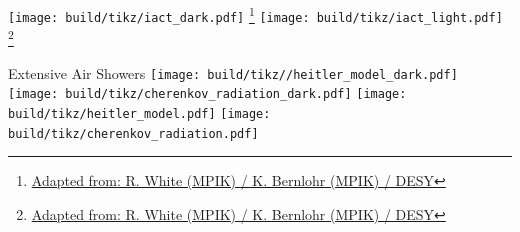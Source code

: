\begin{frame}
  {%
  \centering
  \texttt{[image: build/tikz/iact\_dark.pdf]}
  \footnote{\href{https://www.flickr.com/photos/cta_observatory/45643242354/in/photostream/}{\textcolor{white!85!black}{Adapted from: R. White (MPIK) / K. Bernlohr (MPIK) / DESY}}}
  }
  {%
  \centering
  \texttt{[image: build/tikz/iact\_light.pdf]}
  \footnote{\href{https://www.flickr.com/photos/cta_observatory/45643242354/in/photostream/}{\textcolor{darkgray!85!black}{Adapted from: R. White (MPIK) / K. Bernlohr (MPIK) / DESY}}}
  }
\end{frame}

\begin{frame}{Extensive Air Showers}
    {%
    \texttt{[image: build/tikz//heitler\_model\_dark.pdf]}
    \texttt{[image: build/tikz/cherenkov\_radiation\_dark.pdf]}
    }
    {%
    \texttt{[image: build/tikz/heitler\_model.pdf]}
    \texttt{[image: build/tikz/cherenkov\_radiation.pdf]}
    }
\end{frame}

